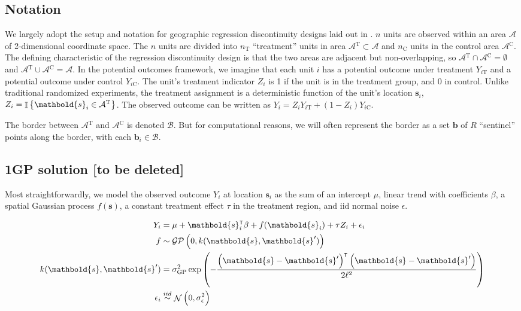 \documentclass[letter]{article}
\DeclareMathOperator{\Ind}{\mathbb{I}}
\DeclareMathOperator{\normal}{\mathcal{N}}
\newcommand{\gp}{\mathcal{GP}}
\newcommand{\trans}{^{\intercal}}
\newcommand{\area}{\mathcal{A}}
\newcommand{\treat}{\mathrm{T}}
\newcommand{\ctrol}{\mathrm{C}}
\newcommand{\treatind}{Z}
\newcommand{\treatarea}{\area{}^{\treat}}
\newcommand{\ctrolarea}{\area{}^{\ctrol}}
\newcommand{\sigmaf}{\sigma_{\mathrm{GP}}}
\newcommand{\svec}{\mathbold{s}}
\newcommand{\iid}{iid}
\newcommand{\border}{\mathcal{B}}
\newcommand{\sentinels}{\bm{b}}
\newcommand{\numsent}{R}
\renewcommand{\cite}[1]{\citep{#1}}
\begin{document}
\subsection{Notation}\label{notation}

We largely adopt the setup and notation for geographic regression discontinuity designs laid out in \cite{keele_titiunik_2015}.
\(n\) units are observed within an area \(\area\) of 2-dimensional coordinate space.
The \(n\) units are divided into \(n_\treat\) ``treatment'' units in area \(\treatarea \subset \area\)
and \(n_\ctrol\) units in the control area \(\ctrolarea\).
The defining characteristic of the regression discontinuity design is that the two areas are adjacent but non-overlapping, so \(\treatarea \cap \ctrolarea = \emptyset\) and \(\treatarea \cup \ctrolarea = \area\).
In the potential outcomes framework, we imagine that each unit \(i\) has a potential outcome under treatment \(Y_{i\treat}\) and a potential outcome under control \(Y_{i\ctrol}\).
The unit's treatment indicator \(\treatind_i\) is 1 if the unit is in the treatment group, and 0 in control.
Unlike traditional randomized experiments, the treatment assignment is a deterministic function of the unit's location \(\svec_i\), \(\treatind_i = \Ind\cbr{\svec_i \in \treatarea}\).
The observed outcome can be written as \(Y_i = \treatind_i Y_{i\treat} + (1 - \treatind_i) Y_{i\ctrol}\).

The border between \(\treatarea\) and \(\ctrolarea\) is denoted \(\border\).
But for computational reasons, we will often represent the border as a set \(\sentinels\) of \(\numsent\) ``sentinel'' points along the border, with each \(\sentinels_i \in \border\).
    


    	\subsection{1GP solution {[}to be deleted{]}}\label{gp-solution-to-be-deleted}

Most straightforwardly, we model the observed outcome \(Y_i\) at location \(\svec_i\) as the sum of an intercept \(\mu\), linear trend with coefficients \(\beta\), a spatial Gaussian process \(f(\svec)\), a constant treatment effect \(\tau\) in the treatment region, and iid normal noise \(\epsilon\).

\begin{equation}\begin{split}
Y_i &= \mu+\svec_i\trans\beta + f(\svec_i) + \tau \treatind_i + \epsilon_i \\
f &\sim \gp\del{0, k(\svec, \svec')} \\
k(\svec,\svec') &= \sigmaf^2 \exp\del{ - \frac{\del{\svec-\svec'}\trans\del{\svec-\svec'}}{2 \ell^2}} \\
\epsilon_i &\overset{\iid}{\sim} \normal\del{0,\sigma_\epsilon^2}
\end{split}\end{equation}
\end{document}
